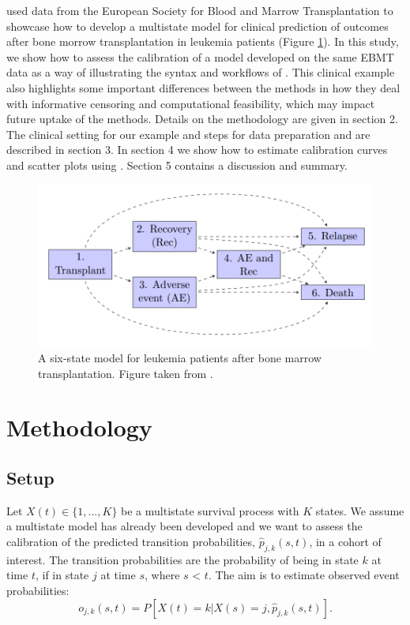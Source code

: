 \documentclass[article,shortnames]{jss}
\begin{document}
\cite{DeWreede2011} used data from the European Society for Blood and Marrow Transplantation \citep{EBMT2023} to showcase how to develop a multistate model for clinical prediction of outcomes after bone morrow transplantation in leukemia patients (Figure \ref{fig:msm}). In this study, we show how to assess the calibration of a model developed on the same EBMT data as a way of illustrating the syntax and workflows of . This clinical example also highlights some important differences between the methods in how they deal with informative censoring and computational feasibility, which may impact future uptake of the methods. Details on the methodology are given in section 2. The clinical setting for our example and steps for data preparation and are described in section 3. In section 4 we show how to estimate calibration curves and scatter plots using . Section 5 contains a discussion and summary.

\begin{figure}
  \centering
  \includegraphics{Figure1.png}
  \caption{\label{fig:msm} A six-state model for leukemia patients after bone marrow transplantation. Figure taken from \citep{DeWreede2011}.}
\end{figure}

\section{Methodology} \label{sec:methodology}

\subsection{Setup} \label{sec:setup}

Let $X(t) \in \{1, ..., K\}$ be a multistate survival process with $K$ states. We assume a multistate model has already been developed and we want to assess the calibration of the predicted transition probabilities, $\hat{p}_{j,k}(s, t)$, in a cohort of interest. The transition probabilities are the probability of being in state $k$ at time $t$, if in state $j$ at time $s$, where $s$ < $t$. The aim is to estimate observed event probabilities: $$o_{j,k}(s,t) = P[X(t)=k|X(s) = j, \hat{p}_{j,k}(s,t)].$$
\end{document}
